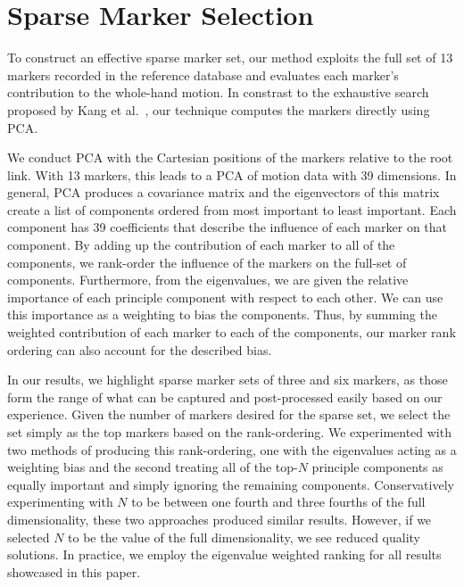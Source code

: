 
\section{Sparse Marker Selection}
To construct an effective sparse marker set, our method exploits the full set of 13 markers recorded in the reference database and evaluates each marker's contribution to the whole-hand motion. 
In constrast to the exhaustive search proposed by Kang et al.~, our technique computes the markers directly using PCA.

We conduct PCA with the Cartesian positions of the markers relative to the root link. With 13 markers, this leads to a PCA of motion data with 39 dimensions. In general, PCA produces a covariance matrix and the eigenvectors of this matrix create a list of components ordered from most important to least important.  
%
Each component has 39 coefficients that describe the influence of each marker on that component.  By adding up the contribution of each marker to all of the components, we rank-order the influence of the markers on the full-set of components.  Furthermore, from the eigenvalues, we are given the relative importance of each principle component with respect to each other.  We can use this importance as a weighting to bias the components.  Thus, by summing the weighted contribution of each marker to each of the components, our marker rank ordering can also account for the described bias.


In our results, we highlight sparse marker sets of three and six markers, as those form the range of what can be captured and post-processed easily based on our experience. 
Given the number of markers desired for the sparse set, we select the set simply as the top markers based on the rank-ordering.  We experimented with two methods of producing this rank-ordering, one with the eigenvalues acting as a weighting bias and the second treating all of the top-$N$ principle components as equally important and simply ignoring the remaining components. Conservatively experimenting with $N$ to be between one fourth and three fourths of the full dimensionality, these two approaches produced similar results.   However, if we selected $N$ to be the value of the full dimensionality, we see reduced quality solutions.  In practice, we employ the eigenvalue weighted ranking for all results showcased in this paper.  

